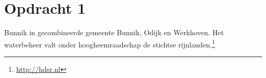 

\section{Opdracht 1}

Bunnik in gecombineerde gemeente Bunnik, Odijk en Werkhoven.
Het waterbeheer valt onder hoogheemraadschap de stichtse rijnlanden.\footnote{\url{http://hdsr.nl}}

